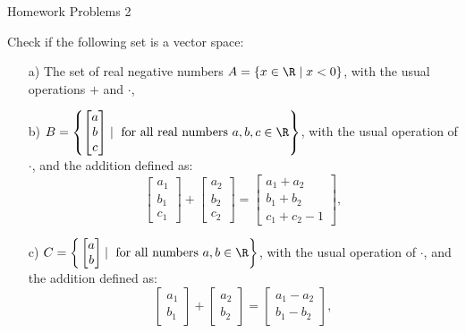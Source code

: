  \begin{center}\begin{large} Homework Problems 2
 \end{large}\end{center}
 \bigskip


% 


\begin{problem}[3 points]
Check if the following set is a vector space:

    \begin{enumerate}
        \item [a)] The set of real negative numbers $A = \{x\in\R \mid x < 0\}$, with the usual operations $+$ and $\cdot$,

        \item [b)] $B = \left\{ \begin{bmatrix} a \\ b \\ c\end{bmatrix} \mid \text{ for all real numbers }a, b, c\in\R\right\}$, with the usual operation of $\cdot$, and the addition defined as:
        \[ \begin{bmatrix} a_1 \\ b_1 \\ c_1\end{bmatrix} + \begin{bmatrix} a_2 \\ b_2 \\ c_2\end{bmatrix} = \begin{bmatrix} a_1 + a_2 \\ b_1 + b_2\\ c_1 + c_2 - 1\end{bmatrix} ,\]
        
        \item [c)] $C =  \bigg\{ \begin{bmatrix} a \\ b \end{bmatrix} \mid \text{ for all numbers }a,b\in\R\bigg\}$, with the usual operation of $\cdot$, and the addition defined as:
        \[ \begin{bmatrix} a_1 \\ b_1 \end{bmatrix} +\begin{bmatrix} a_2 \\ b_2 \end{bmatrix} = \begin{bmatrix} a_1-a_2 \\ b_1-b_2 \end{bmatrix} , \]


\end{enumerate}
\end{problem}
